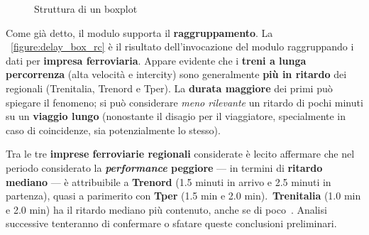 \documentclass[12pt,a4paper,italian]{report}
\begin{document}
\begin{figure}[h] \centering
    \caption{Struttura di un boxplot}
    \label{figure:boxplot}
\end{figure}

Come già detto, il modulo supporta il \textbf{raggruppamento}.  La
\figurename~\ref{figure:delay_box_rc} è il risultato dell'invocazione
del modulo raggruppando i dati per \textbf{impresa ferroviaria}.
Appare evidente che i \textbf{treni a lunga percorrenza} (alta
velocità e intercity) sono generalmente \textbf{più in ritardo} dei
regionali (Trenitalia, Trenord e Tper).  La \textbf{durata maggiore}
dei primi può spiegare il fenomeno; si può considerare \textit{meno
    rilevante} un ritardo di pochi minuti su un \textbf{viaggio lungo}
(nonostante il disagio per il viaggiatore, specialmente in caso di
coincidenze, sia potenzialmente lo stesso).

Tra le tre \textbf{imprese ferroviarie regionali} considerate è lecito
affermare che nel periodo considerato la \textbf{\textit{performance}
    peggiore} --- in termini di \textbf{ritardo mediano} --- è
attribuibile a \textbf{Trenord} (1.5 minuti in arrivo e 2.5 minuti in
partenza), quasi a parimerito con \textbf{Tper} (1.5 min e 2.0
min).\@~\textbf{Trenitalia} (1.0 min e 2.0 min) ha il ritardo mediano
più contenuto, anche se di poco~\cite[C]{StatJup}.  Analisi successive
tenteranno di confermare o sfatare queste conclusioni preliminari.
\end{document}
